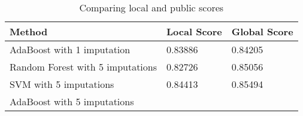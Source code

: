 \begin{table}[H]
  \centering
  \begin{tabular}{lll}
    \toprule
    Method & Local Score & Global Score\\
    \midrule
    AdaBoost with 1 imputation & 0.83886 & 0.84205\\
    Random Forest with 5 imputations & 0.82726 & 0.85056\\
    SVM with 5 imputations & 0.84413 & 0.85494\\
    AdaBoost with 5 imputations & & \\
    \bottomrule
  \end{tabular}
  \caption{Comparing local and public scores}
  \label{tab:localpublic}
\end{table}